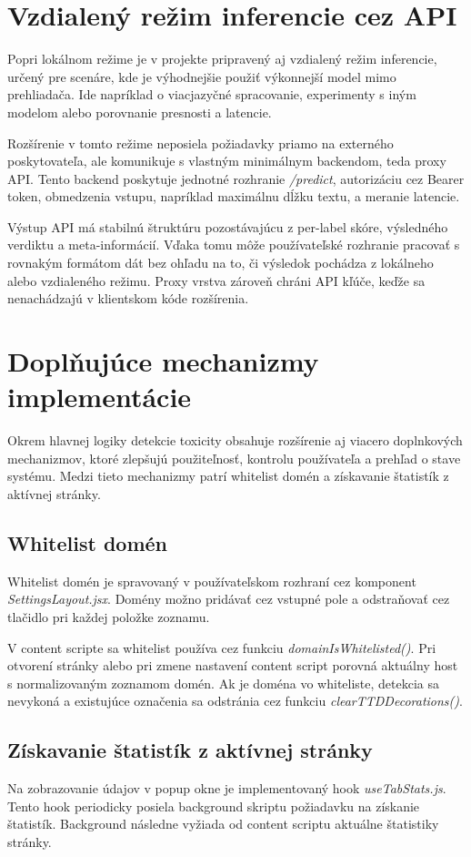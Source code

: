 \section{Vzdialený režim inferencie cez API}
Popri lokálnom režime je v projekte pripravený aj vzdialený režim inferencie, určený pre scenáre, kde je výhodnejšie použiť výkonnejší model mimo prehliadača. Ide napríklad o viacjazyčné spracovanie, experimenty s iným modelom alebo porovnanie presnosti a latencie.

Rozšírenie v tomto režime neposiela požiadavky priamo na externého poskytovateľa, ale komunikuje s vlastným minimálnym backendom, teda proxy API. Tento backend poskytuje jednotné rozhranie \emph{/predict}, autorizáciu cez Bearer token, obmedzenia vstupu, napríklad maximálnu dĺžku textu, a meranie latencie.

Výstup API má stabilnú štruktúru pozostávajúcu z per-label skóre, výsledného verdiktu a meta-informácií. Vďaka tomu môže používateľské rozhranie pracovať s rovnakým formátom dát bez ohľadu na to, či výsledok pochádza z lokálneho alebo vzdialeného režimu. Proxy vrstva zároveň chráni API kľúče, keďže sa nenachádzajú v klientskom kóde rozšírenia.

\section{Doplňujúce mechanizmy implementácie}

Okrem hlavnej logiky detekcie toxicity obsahuje rozšírenie aj viacero doplnkových mechanizmov, ktoré zlepšujú použiteľnosť, kontrolu používateľa a prehľad o stave systému. Medzi tieto mechanizmy patrí whitelist domén a získavanie štatistík z aktívnej stránky.

\subsection{Whitelist domén}
Whitelist domén je spravovaný v používateľskom rozhraní cez komponent \emph{SettingsLayout.jsx}. Domény možno pridávať cez vstupné pole a odstraňovať cez tlačidlo pri každej položke zoznamu.

V content scripte sa whitelist používa cez funkciu \emph{domainIsWhitelisted()}. Pri otvorení stránky alebo pri zmene nastavení content script porovná aktuálny host s normalizovaným zoznamom domén. Ak je doména vo whiteliste, detekcia sa nevykoná a existujúce označenia sa odstránia cez funkciu \emph{clearTTDDecorations()}.

\subsection{Získavanie štatistík z aktívnej stránky}
Na zobrazovanie údajov v popup okne je implementovaný hook \emph{useTabStats.js}. Tento hook periodicky posiela background skriptu požiadavku na získanie štatistík. Background následne vyžiada od content scriptu aktuálne štatistiky stránky.

